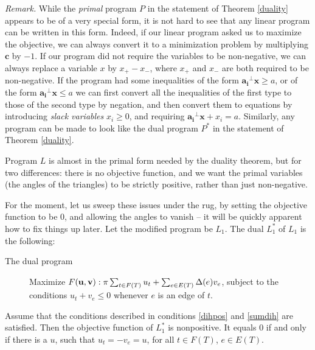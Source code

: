 \documentclass{acmart}
\newcommand{\thm}[2]{\begin{#1} #2 \end{#1}}
\begin{document}
\medskip\noindent
\textit{Remark.}
While the \emph{primal} program $P$ in the statement of Theorem
\ref{duality} appears to be of a very special form, it is not hard to
see that any linear program can be written in this form. Indeed, if
our linear program asked us to maximize the objective, we can always
convert it to a minimization problem by multiplying $\mathbf{c}$ by
$-1$. If our program did not require the variables to be non-negative,
we can always replace a variable $x$ by $x_+ - x_-$, where $x_+$ and
$x_-$ are both required to be non-negative. If the program had some
inequalities of the form $\mathbf{a_i}^\perp \mathbf{x} \geq a$, or of
the form $\mathbf{a_i}^\perp \mathbf{x} \leq a$ we can first convert
all the inequalities of the first type to those of the second type by
negation, and then convert them to equations by introducing
\emph{slack variables} $x_i \geq 0$, and requiring 
$\mathbf{a_i}^\perp \mathbf{x} + x_i = a.$ Similarly, any program can
be made to look like the dual program $P^*$ in the statement of
Theorem \ref{duality}.

Program $L$ is almost in the primal form needed by the duality
theorem, but for two differences: there is no 
objective function, and we want the primal variables (the angles
of the triangles) to be strictly positive, rather than just non-negative.

For the moment, let us sweep these issues under the rug, by 
setting the objective function to be $0$, and allowing the
angles to vanish -- it will be quickly apparent how to fix
things up later. Let the modified program be $L_1$. The dual 
$L_1^*$ of $L_1$ is the following:

\begin{description}

\item[The dual program]
Maximize $F({\bf u}, {\bf v}):\pi \sum_{t \in F(T)} u_t + \sum_{e\in E(T)} \Delta(e)v_e$,
subject to the conditions
$u_t+v_e\leq 0$ whenever $e$ is an edge of $t$.

\end{description}

\thm{theorem}
{
\label{maindual}
Assume that the conditions described in conditions \ref{dihpos} and
\ref{sumdih} are satisfied.
Then the objective function of $L_1^*$ is nonpositive. It equals 
$0$ if and only if there is a $u$, such that $u_t=-v_e=u$, for
all $t\in F(T)$, $e\in E(T)$.
}
\end{document}
